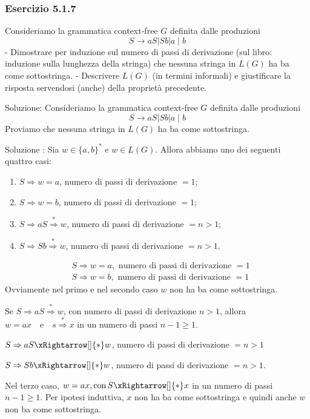 \subsubsection{Esercizio 5.1.7}
Consideriamo la grammatica context-free $G$ definita dalle produzioni
$$
S \rightarrow a S|S b| a \mid b
$$
- Dimostrare per induzione sul numero di passi di derivazione (sul libro: induzione sulla lunghezza della stringa) che nessuna stringa in $L(G)$ ha ba come sottostringa.
- Descrivere $L(G)$ (in termini informali) e giustificare la risposta servendosi (anche) della proprietà precedente.

Soluzione:
Consideriamo la grammatica context-free $G$ definita dalle produzioni
$$
S \rightarrow a S|S b| a \mid b
$$
Proviamo che nessuna stringa in $L(G)$ ha ba come sottostringa.

Soluzione :
Sia $w \in\{a, b\}^{*}$ e $w \in L(G)$. Allora abbiamo uno dei seguenti quattro casi:
\begin{enumerate}
    \item $S \Rightarrow w=a$, numero di passi di derivazione $=1$;
\item $S \Rightarrow w=b$, numero di passi di derivazione $=1$;
\item $S \Rightarrow a S \stackrel{*}{\Rightarrow} w$, numero di passi di derivazione $=n>1$;
\item $S \Rightarrow S b \stackrel{*}{\Rightarrow} w$, numero di passi di derivazione $=n>1 .$
\end{enumerate}

$$
\begin{aligned}
&S \Rightarrow w=a, \text { numero di passi di derivazione }=1 \\
&S \Rightarrow w=b, \text { numero di passi di derivazione }=1
\end{aligned}
$$
Ovviamente nel primo e nel secondo caso $w$ non ha ba come sottostringa.

Se $S \Rightarrow a S \stackrel{*}{\Rightarrow} w$, con numero di passi di derivazione $n>1$, allora $w=a x \quad \text{e} \quad s \stackrel{*}{\Rightarrow} x$ in un numero di passi $n-1 \geq 1$.

$S \Rightarrow a S \xRightarrow[]{*} w$, numero di passi di derivazione $=n>1$

$S \Rightarrow S b \xRightarrow[]{*} w$, numero di passi di derivazione $=n>1 .$


Nel terzo caso, $w=a x, \operatorname{con} S \xRightarrow[]{*} x$ in un numero di passi $n-1 \geq 1$. Per ipotesi induttiva, $x$ non ha ba come sottostringa e quindi anche $w$ non ba come sottostringa.

